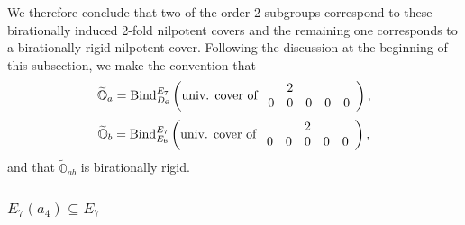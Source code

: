 \documentclass[11pt]{amsart}
\renewcommand{\O}{{\mathbb O}}
\newcommand{\BInd}{{{\mbox{\rm Bind}}}}
\newcommand{\covO}{\widetilde{\O}}
\numberwithin{equation}{section}
\begin{document}
	We therefore conclude that two of the order 2 subgroups correspond to these birationally induced 2-fold nilpotent covers and the remaining one corresponds to a birationally rigid nilpotent cover. Following the discussion at the beginning of this subsection, we make the convention that 
	$$\covO_a=\BInd_{D_6}^{E_7}\left(\mbox{univ. cover of }\begin{array}{c c c c c}
		& 2 & & & \\
		0 & 0 & 0 & 0 & 0  \\
	\end{array} \right),$$ 
	$$\covO_b=\BInd_{E_6}^{E_7}\left(\mbox{univ. cover of }\begin{array}{c c c c c}
		& & 2 & & \\
		0 & 0 & 0 & 0 & 0  \\
	\end{array} \right),$$ 
	and that $\covO_{ab}$ is birationally rigid.
	
	\subsubsection{\texorpdfstring{$E_7(a_4)\subseteq E_7$}{E7a4 in E7}}\label{sss: E7a4 in E7}
	
\end{document}
